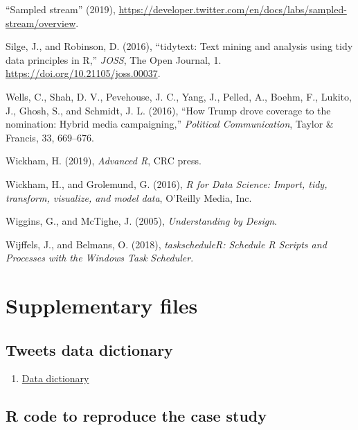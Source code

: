 \documentclass[
]{article}
\providecommand{\tightlist}{%
  \setlength{\itemsep}{0pt}\setlength{\parskip}{0pt}}
\begin{document}
\leavevmode\hypertarget{ref-tweet_stream}{}%
``Sampled stream'' (2019), \url{https://developer.twitter.com/en/docs/labs/sampled-stream/overview}.

\leavevmode\hypertarget{ref-tidytext}{}%
Silge, J., and Robinson, D. (2016), ``tidytext: Text mining and analysis using tidy data principles in R,'' \emph{JOSS}, The Open Journal, 1. \url{https://doi.org/10.21105/joss.00037}.

\leavevmode\hypertarget{ref-wells2016trump}{}%
Wells, C., Shah, D. V., Pevehouse, J. C., Yang, J., Pelled, A., Boehm, F., Lukito, J., Ghosh, S., and Schmidt, J. L. (2016), ``How Trump drove coverage to the nomination: Hybrid media campaigning,'' \emph{Political Communication}, Taylor \& Francis, 33, 669--676.

\leavevmode\hypertarget{ref-wickham2019advanced}{}%
Wickham, H. (2019), \emph{Advanced R}, CRC press.

\leavevmode\hypertarget{ref-wickham2016r}{}%
Wickham, H., and Grolemund, G. (2016), \emph{R for Data Science: Import, tidy, transform, visualize, and model data}, O'Reilly Media, Inc.

\leavevmode\hypertarget{ref-wiggins2005understanding}{}%
Wiggins, G., and McTighe, J. (2005), \emph{Understanding by Design}.

\leavevmode\hypertarget{ref-taskscheduleR}{}%
Wijffels, J., and Belmans, O. (2018), \emph{taskscheduleR: Schedule R Scripts and Processes with the Windows Task Scheduler}.

\newpage

\hypertarget{supplementary-files}{%
\section{Supplementary files}\label{supplementary-files}}

\hypertarget{tweets-data-dictionary}{%
\subsection{Tweets data dictionary}\label{tweets-data-dictionary}}

\begin{enumerate}
\def\labelenumi{\arabic{enumi}.}
\tightlist
\item
  \href{https://github.com/fboehm/jse-2019/blob/master/data/tweets-data-dictionary.csv}{Data dictionary}
\end{enumerate}

\hypertarget{r-code-to-reproduce-the-case-study}{%
\subsection{R code to reproduce the case study}\label{r-code-to-reproduce-the-case-study}}
\end{document}
